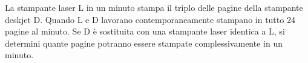 La stampante laser L in un minuto stampa il triplo delle pagine della stampante deskjet D.
Quando L e D lavorano contemporaneamente stampano in tutto 24 pagine al minuto.
Se D è sostituita con una stampante laser identica a L, 
si determini quante pagine potranno essere stampate complessivamente in
un minuto.

